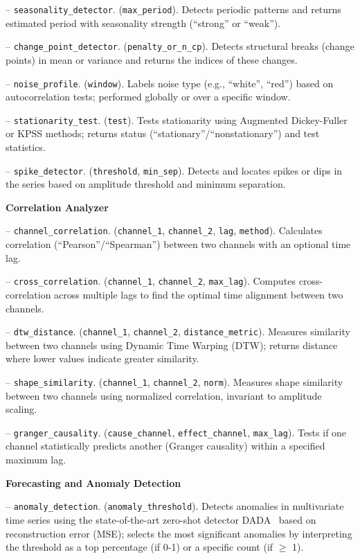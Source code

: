 \noindent-- \texttt{seasonality\_detector}. (\texttt{max\_period}). Detects periodic patterns and returns estimated period with seasonality strength (``strong'' or ``weak'').

\noindent-- \texttt{change\_point\_detector}. (\texttt{penalty\_or\_n\_cp}).  Detects structural breaks (change points) in mean or variance and returns the indices of these changes.

\noindent-- \texttt{noise\_profile}. (\texttt{window}). Labels noise type (e.g., ``white'', ``red'') based on autocorrelation tests; performed globally or over a specific window.

\noindent-- \texttt{stationarity\_test}. (\texttt{test}). Tests stationarity using Augmented Dickey-Fuller or KPSS methods; returns status (``stationary''/``nonstationary'') and test statistics.

\noindent-- \texttt{spike\_detector}. (\texttt{threshold}, \texttt{min\_sep}). Detects and locates spikes or dips in the series based on amplitude threshold and minimum separation.

\textbf{Correlation Analyzer}

\noindent-- \texttt{channel\_correlation}. (\texttt{channel\_1}, \texttt{channel\_2}, \texttt{lag}, \texttt{method}). Calculates correlation (``Pearson''/``Spearman'') between two channels with an optional time lag.

\noindent-- \texttt{cross\_correlation}. (\texttt{channel\_1}, \texttt{channel\_2}, \texttt{max\_lag}). Computes cross-correlation across multiple lags to find the optimal time alignment between two channels.

\noindent-- \texttt{dtw\_distance}. (\texttt{channel\_1}, \texttt{channel\_2}, \texttt{distance\_metric}). Measures similarity between two channels using Dynamic Time Warping (DTW); returns distance where lower values indicate greater similarity.

\noindent-- \texttt{shape\_similarity}. (\texttt{channel\_1}, \texttt{channel\_2}, \texttt{norm}). Measures shape similarity between two channels using normalized correlation, invariant to amplitude scaling.

\noindent-- \texttt{granger\_causality}. (\texttt{cause\_channel}, \texttt{effect\_channel}, \texttt{max\_lag}). Tests if one channel statistically predicts another (Granger causality) within a specified maximum lag.

\textbf{Forecasting and Anomaly Detection}

\noindent-- \texttt{anomaly\_detection}. (\texttt{anomaly\_threshold}). Detects anomalies in multivariate time series using the state-of-the-art zero-shot detector DADA~\citep{shentu2024towards} based on reconstruction error (MSE); selects the most significant anomalies by interpreting the threshold as a top percentage (if 0-1) or a specific count (if $\ge$ 1).

